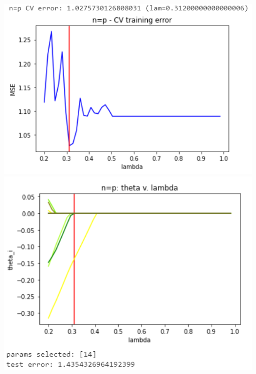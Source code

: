 \documentclass[11pt]{article}
\begin{document}
\begin{center}
\includegraphics[scale=0.7]{charts/ridge_exp_corr_n_eq_p_err.PNG}
\includegraphics[scale=0.7]{charts/ridge_exp_corr_n_eq_p_thetas.PNG}


\end{center}
\end{document}
